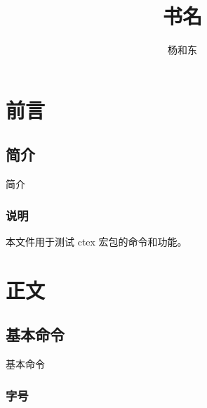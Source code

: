\documentclass[cs4size,a4paper,fancyhdr,fntef,UTF8,adobefonts,hyperref]{ctexbook}
\begin{document}
\title{书名}
\author{杨和东}
\maketitle
\tableofcontents
\listoftodos[待处理问题]
\part{前言}
\chapter{简介} \label{chapter:intro}
简介
\section{说明}

本文件用于测试 ctex 宏包的命令和功能。
\part{正文}

\chapter{基本命令}

基本命令


\section{字号}





\printindex
\end{document}
